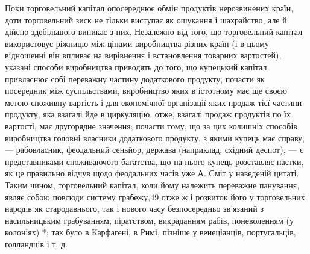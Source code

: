 Поки торговельний капітал опосереднює обмін продуктів
нерозвинених країн, доти торговельний зиск не тільки виступає
як ошукання і шахрайство, але й дійсно здебільшого виникає з них.
Незалежно від того, що торговельний капітал використовує ріжницю
між цінами виробництва різних країн (і в цьому відношенні
він впливає на вирівнення і встановлення товарних вартостей),
указані способи виробництва приводять до того, що
купецький капітал привласнює собі переважну частину додаткового
продукту, почасти як посередник між суспільствами, виробництво
яких в істотному має ще своєю метою споживну вартість
і для економічної організації яких продаж тієї частини продукту,
яка взагалі йде в циркуляцію, отже, взагалі продаж продуктів по
їх вартості, має другорядне значення; почасти тому, що за цих
колишніх способів виробництва головні власники додаткового
продукту, з якими купець має справу, — рабовласник, феодальний
сеньйор, держава (наприклад, східний деспот), — є представниками
споживаючого багатства, що на нього купець розставляє
пастки, як це правильно відчув щодо феодальних часів
уже А. Сміт у наведеній цитаті. Таким чином, торговельний капітал,
коли йому належить переважне панування, являє собою повсюди
систему грабежу,49 отже ж і розвиток його у торговельних
народів як стародавнього, так і нового часу безпосередньо зв’язаний
з насильницьким грабуванням, піратством, викраданням рабів,
поневоленням (у колоніях) *; так було в Карфагені, в Римі,
пізніше у венеціанців, португальців, голландців і т. д.

